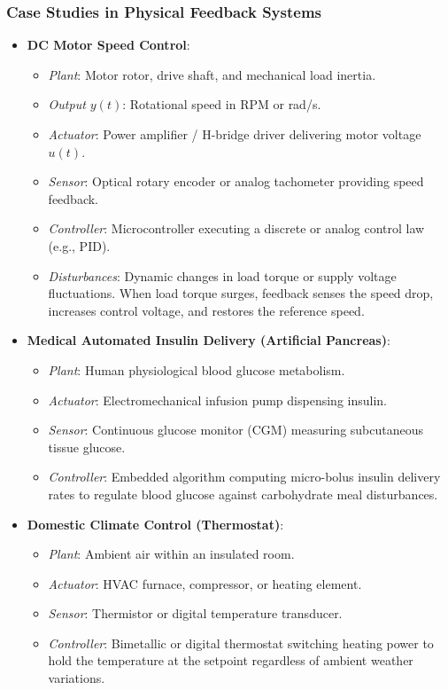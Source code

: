 \documentclass[12pt,onecolumn,twoside ]{article}
\begin{document}
	\subsubsection{Case Studies in Physical Feedback Systems}
	\begin{itemize}
		\item
		\textbf{DC Motor Speed Control}:
		\begin{itemize}
			\item
			\textit{Plant}: Motor rotor, drive shaft, and mechanical load inertia.
			\item
			\textit{Output $y(t)$}: Rotational speed in RPM or rad/s.
			\item
			\textit{Actuator}: Power amplifier / H-bridge driver delivering motor voltage $u(t)$.
			\item
			\textit{Sensor}: Optical rotary encoder or analog tachometer providing speed feedback.
			\item
			\textit{Controller}: Microcontroller executing a discrete or analog control law (e.g., PID).
			\item
			\textit{Disturbances}: Dynamic changes in load torque or supply voltage fluctuations. When load torque surges, feedback senses the speed drop, increases control voltage, and restores the reference speed.
		\end{itemize}
		\item
		\textbf{Medical Automated Insulin Delivery (Artificial Pancreas)}:
		\begin{itemize}
			\item
			\textit{Plant}: Human physiological blood glucose metabolism.
			\item
			\textit{Actuator}: Electromechanical infusion pump dispensing insulin.
			\item
			\textit{Sensor}: Continuous glucose monitor (CGM) measuring subcutaneous tissue glucose.
			\item
			\textit{Controller}: Embedded algorithm computing micro-bolus insulin delivery rates to regulate blood glucose against carbohydrate meal disturbances.
		\end{itemize}
		\item
		\textbf{Domestic Climate Control (Thermostat)}:
		\begin{itemize}
			\item
			\textit{Plant}: Ambient air within an insulated room.
			\item
			\textit{Actuator}: HVAC furnace, compressor, or heating element.
			\item
			\textit{Sensor}: Thermistor or digital temperature transducer.
			\item
			\textit{Controller}: Bimetallic or digital thermostat switching heating power to hold the temperature at the setpoint regardless of ambient weather variations.
		\end{itemize}
	\end{itemize}
	
\end{document}
